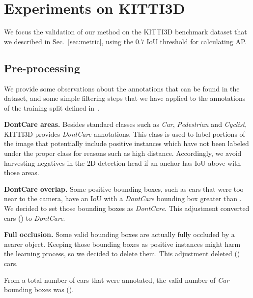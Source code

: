 \documentclass[10pt,twocolumn,letterpaper]{article}
\renewcommand{\paragraph}[1]{

        \vspace{3pt}
	\noindent\textbf{#1}}
\begin{document}
\section{Experiments on KITTI3D}\label{sec:expKITTI}

We focus the validation of our method on the KITTI3D benchmark dataset that we described in Sec.~\ref{sec:metric}, using the 0.7 IoU threshold for calculating AP.


\subsection{Pre-processing}\label{ss:pre-processing}

We provide some observations about the annotations that can be found in the dataset, and some simple filtering steps that we have applied to the annotations of the training split defined in~\cite{NIPS2015_Chen}.

\paragraph{DontCare areas.} Besides standard classes such as \textit{Car}, \textit{Pedestrian} and \textit{Cyclist}, KITTI3D provides  \textit{DontCare} annotations. This class is used to label portions of the image that potentially include positive instances which have not been labeled under the proper class for reasons such as high distance. Accordingly, we avoid harvesting negatives in the 2D detection head if an anchor has IoU above  with those areas. 

\paragraph{DontCare overlap.} Some positive bounding boxes, such as cars that were too near to the camera, have an IoU with a \textit{DontCare} bounding box greater than . We decided to set those bounding boxes as \textit{DontCare}. This adjustment converted  cars () to \textit{DontCare}.

\paragraph{Full occlusion.} Some valid bounding boxes are actually fully occluded by a nearer object. Keeping those bounding boxes as positive instances might harm the learning process, so we decided to delete them. This adjustment deleted  () cars.

\vspace{3pt}
From a total number of  cars that were annotated, the valid number of \textit{Car} bounding boxes was  ().
\end{document}
